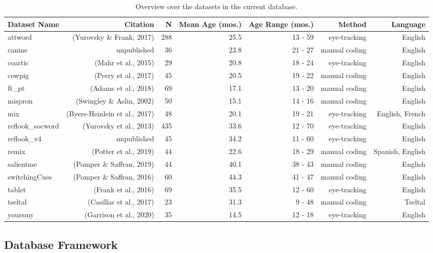 \documentclass[10pt, letterpaper]{article}
\begin{document}
\begin{table}[ht]
\centering
\begingroup\fontsize{9pt}{10pt}\selectfont
\begin{tabular}{lrrrrrr}
  \hline
Dataset Name & Citation & N & Mean Age (mos.) & Age Range (mos.) & Method & Language \\ 
  \hline
attword & (Yurovsky \& Frank, 2017) & 288 & 25.5 & 13 - 59 & eye-tracking & English \\ 
  canine & unpublished & 36 & 23.8 & 21 - 27 & manual coding & English \\ 
  coartic & (Mahr et al., 2015) & 29 & 20.8 & 18 - 24 & eye-tracking & English \\ 
  cowpig & (Perry et al., 2017) & 45 & 20.5 & 19 - 22 & manual coding & English \\ 
  ft\_pt & (Adams et al., 2018) & 69 & 17.1 & 13 - 20 & manual coding & English \\ 
  mispron & (Swingley \& Aslin, 2002) & 50 & 15.1 & 14 - 16 & manual coding & English \\ 
  mix & (Byers-Heinlein et al., 2017) & 48 & 20.1 & 19 - 21 & eye-tracking & English, French \\ 
  reflook\_socword & (Yurovsky et al., 2013) & 435 & 33.6 & 12 - 70 & eye-tracking & English \\ 
  reflook\_v4 & unpublished & 45 & 34.2 & 11 - 60 & eye-tracking & English \\ 
  remix & (Potter et al., 2019) & 44 & 22.6 & 18 - 29 & manual coding & Spanish, English \\ 
  salientme & (Pomper \& Saffran, 2019) & 44 & 40.1 & 38 - 43 & manual coding & English \\ 
  switchingCues & (Pomper \& Saffran, 2016) & 60 & 44.3 & 41 - 47 & manual coding & English \\ 
  tablet & (Frank et al., 2016) & 69 & 35.5 & 12 - 60 & eye-tracking & English \\ 
  tseltal & (Casillas et al., 2017) & 23 & 31.3 & 9 - 48 & manual coding & Tseltal \\ 
  yoursmy & (Garrison et al., 2020) & 35 & 14.5 & 12 - 18 & eye-tracking & English \\ 
   \hline
\end{tabular}
\endgroup
\caption{Overview over the datasets in the current database.} 
\end{table}

\hypertarget{database-framework}{%
\subsection{Database Framework}\label{database-framework}}
\end{document}
